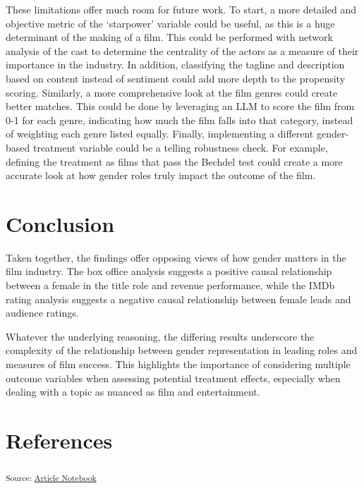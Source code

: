 \documentclass[
]{agujournal2019}
\begin{document}
These limitations offer much room for future work. To start, a more
detailed and objective metric of the `starpower' variable could be
useful, as this is a huge determinant of the making of a film. This
could be performed with network analysis of the cast to determine the
centrality of the actors as a measure of their importance in the
industry. In addition, classifying the tagline and description based on
content instead of sentiment could add more depth to the propensity
scoring. Similarly, a more comprehensive look at the film genres could
create better matches. This could be done by leveraging an LLM to score
the film from 0-1 for each genre, indicating how much the film falls
into that category, instead of weighting each genre listed equally.
Finally, implementing a different gender-based treatment variable could
be a telling robustness check. For example, defining the treatment as
films that pass the Bechdel test could create a more accurate look at
how gender roles truly impact the outcome of the film.

\section{Conclusion}\label{sec-conclusion}

Taken together, the findings offer opposing views of how gender matters
in the film industry. The box office analysis suggests a positive causal
relationship between a female in the title role and revenue performance,
while the IMDb rating analysis suggests a negative causal relationship
between female leads and audience ratings.

Whatever the underlying reasoning, the differing results underscore the
complexity of the relationship between gender representation in leading
roles and measures of film success. This highlights the importance of
considering multiple outcome variables when assessing potential
treatment effects, especially when dealing with a topic as nuanced as
film and entertainment.

\section*{References}\label{references}

\vspace{1em}

\textsubscript{Source:
\href{https://ehealy19.github.io/Matching_Movies/index.qmd.html}{Article
Notebook}}
\end{document}
